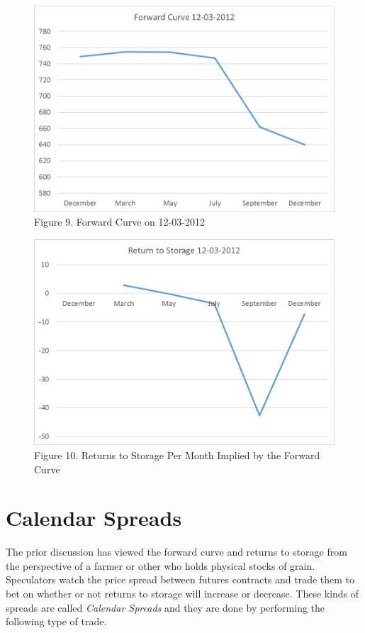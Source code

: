 \documentclass[]{book}
\theoremstyle{definition}
\theoremstyle{definition}
\theoremstyle{remark}
\begin{document}
\begin{figure}[htbp]
\centering
\includegraphics{Excel-files/PricesSpaceTime/forward-curves_files/image017.png}
\caption{Figure 9. Forward Curve on 12-03-2012}
\end{figure}

\begin{figure}[htbp]
\centering
\includegraphics{Excel-files/PricesSpaceTime/forward-curves_files/image019.png}
\caption{Figure 10. Returns to Storage Per Month Implied by the Forward
Curve}
\end{figure}

\section{Calendar Spreads}\label{calendar-spreads}

The prior discussion has viewed the forward curve and returns to storage
from the perspective of a farmer or other who holds physical stocks of
grain. Speculators watch the price spread between futures contracts and
trade them to bet on whether or not returns to storage will increase or
decrease. These kinds of spreads are called \emph{Calendar Spreads} and
they are done by performing the following type of trade.
\end{document}
